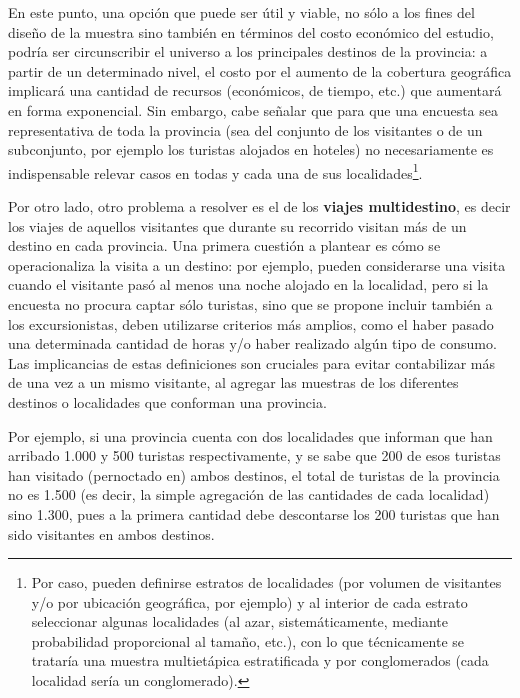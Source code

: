 \documentclass[
]{book}
\begin{document}
En este punto, una opción que puede ser útil y viable, no sólo a los fines del diseño de la muestra sino también en términos del costo económico del estudio, podría ser circunscribir el universo a los principales destinos de la provincia: a partir de un determinado nivel, el costo por el aumento de la cobertura geográfica implicará una cantidad de recursos (económicos, de tiempo, etc.) que aumentará en forma exponencial. Sin embargo, cabe señalar que para que una encuesta sea representativa de toda la provincia (sea del conjunto de los visitantes o de un subconjunto, por ejemplo los turistas alojados en hoteles) no necesariamente es indispensable relevar casos en todas y cada una de sus localidades\footnote{Por caso, pueden definirse estratos de localidades (por volumen de visitantes y/o por ubicación geográfica, por ejemplo) y al interior de cada estrato seleccionar algunas localidades (al azar, sistemáticamente, mediante probabilidad proporcional al tamaño, etc.), con lo que técnicamente se trataría una muestra multietápica estratificada y por conglomerados (cada localidad sería un conglomerado).}.

Por otro lado, otro problema a resolver es el de los \textbf{viajes multidestino}, es decir los viajes de aquellos visitantes que durante su recorrido visitan más de un destino en cada provincia. Una primera cuestión a plantear es cómo se operacionaliza la visita a un destino: por ejemplo, pueden considerarse una visita cuando el visitante pasó al menos una noche alojado en la localidad, pero si la encuesta no procura captar sólo turistas, sino que se propone incluir también a los excursionistas, deben utilizarse criterios más amplios, como el haber pasado una determinada cantidad de horas y/o haber realizado algún tipo de consumo. Las implicancias de estas definiciones son cruciales para evitar contabilizar más de una vez a un mismo visitante, al agregar las muestras de los diferentes destinos o localidades que conforman una provincia.

Por ejemplo, si una provincia cuenta con dos localidades que informan que han arribado 1.000 y 500 turistas respectivamente, y se sabe que 200 de esos turistas han visitado (pernoctado en) ambos destinos, el total de turistas de la provincia no es 1.500 (es decir, la simple agregación de las cantidades de cada localidad) sino 1.300, pues a la primera cantidad debe descontarse los 200 turistas que han sido visitantes en ambos destinos.
\end{document}
